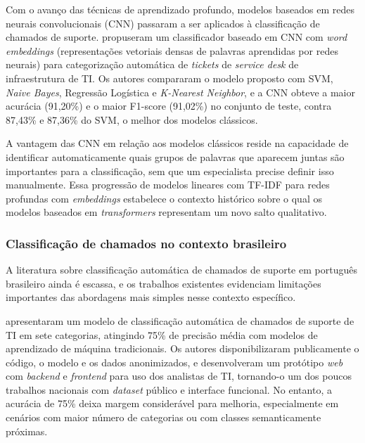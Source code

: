 \documentclass[
    12pt,                %
    openright,           %
    oneside,             %
    a4paper,             %
    english,             %
    brazil               %
]{abntex2}
\begin{document}
Com o avanço das técnicas de aprendizado profundo, modelos baseados em redes neurais convolucionais (CNN) passaram a ser aplicados à classificação de chamados de suporte.  propuseram um classificador baseado em CNN com \textit{word embeddings} (representações vetoriais densas de palavras aprendidas por redes neurais) para categorização automática de \textit{tickets} de \textit{service desk} de infraestrutura de TI. Os autores compararam o modelo proposto com SVM, \textit{Naive Bayes}, Regressão Logística e \textit{K-Nearest Neighbor}, e a CNN obteve a maior acurácia (91,20\%) e o maior F1-score (91,02\%) no conjunto de teste, contra 87,43\% e 87,36\% do SVM, o melhor dos modelos clássicos.

A vantagem das CNN em relação aos modelos clássicos reside na capacidade de identificar automaticamente quais grupos de palavras que aparecem juntas são importantes para a classificação, sem que um especialista precise definir isso manualmente. Essa progressão de modelos lineares com TF-IDF para redes profundas com \textit{embeddings} estabelece o contexto histórico sobre o qual os modelos baseados em \textit{transformers} representam um novo salto qualitativo.

\subsubsection{Classificação de chamados no contexto brasileiro}
\label{subsubsec:helpdesk_brasil}

A literatura sobre classificação automática de chamados de suporte em português brasileiro ainda é escassa, e os trabalhos existentes evidenciam limitações importantes das abordagens mais simples nesse contexto específico.

 apresentaram um modelo de classificação automática de chamados de suporte de TI em sete categorias, atingindo 75\% de precisão média com modelos de aprendizado de máquina tradicionais. Os autores disponibilizaram publicamente o código, o modelo e os dados anonimizados, e desenvolveram um protótipo \textit{web} com \textit{backend} e \textit{frontend} para uso dos analistas de TI, tornando-o um dos poucos trabalhos nacionais com \textit{dataset} público e interface funcional. No entanto, a acurácia de 75\% deixa margem considerável para melhoria, especialmente em cenários com maior número de categorias ou com classes semanticamente próximas.
\end{document}
